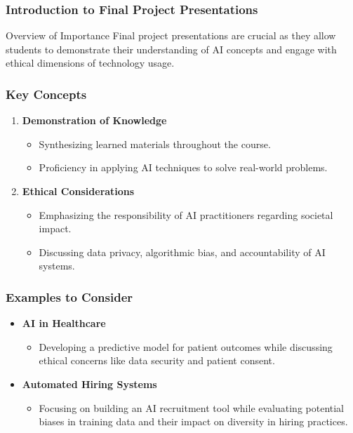\documentclass[aspectratio=169]{beamer}
\begin{document}
\frame{\titlepage}

\begin{frame}[fragile]
    \frametitle{Introduction to Final Project Presentations}
    \begin{block}{Overview of Importance}
        Final project presentations are crucial as they allow students to demonstrate their understanding of AI concepts and engage with ethical dimensions of technology usage.
    \end{block}
\end{frame}

\begin{frame}[fragile]
    \frametitle{Key Concepts}
    \begin{enumerate}
        \item \textbf{Demonstration of Knowledge}
        \begin{itemize}
            \item Synthesizing learned materials throughout the course.
            \item Proficiency in applying AI techniques to solve real-world problems.
        \end{itemize}
        
        \item \textbf{Ethical Considerations}
        \begin{itemize}
            \item Emphasizing the responsibility of AI practitioners regarding societal impact.
            \item Discussing data privacy, algorithmic bias, and accountability of AI systems.
        \end{itemize}
    \end{enumerate}
\end{frame}

\begin{frame}[fragile]
    \frametitle{Examples to Consider}
    \begin{itemize}
        \item \textbf{AI in Healthcare}
        \begin{itemize}
            \item Developing a predictive model for patient outcomes while discussing ethical concerns like data security and patient consent.
        \end{itemize}
        
        \item \textbf{Automated Hiring Systems}
        \begin{itemize}
            \item Focusing on building an AI recruitment tool while evaluating potential biases in training data and their impact on diversity in hiring practices.
        \end{itemize}
    \end{itemize}
\end{frame}
\end{document}
